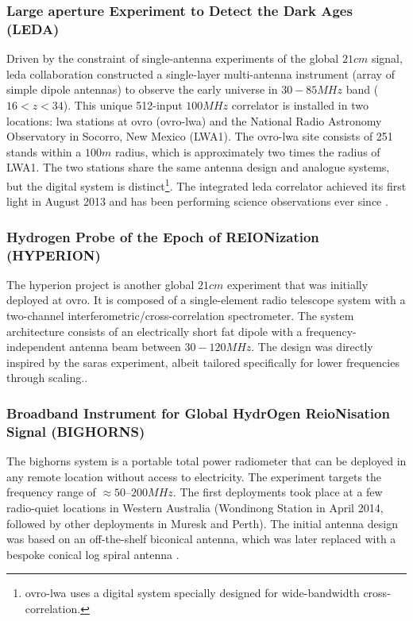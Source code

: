 \documentclass[12pt, TexShade, letterpaper]{report}
\begin{document}
\subsubsection{Large aperture Experiment to Detect the Dark Ages (LEDA)}
Driven by the constraint of single-antenna experiments of the global $21cm$ signal, \gls{leda} collaboration constructed a single-layer multi-antenna instrument (array of simple dipole antennas) to observe the early universe in $30-85MHz$ band ($16 < z < 34$).
This unique 512-input $100MHz$ correlator is installed in two locations: \gls{lwa} stations at \gls{ovro} (\gls{ovro}-\gls{lwa}) and the National Radio Astronomy Observatory in Socorro, New Mexico (LWA1). 
The \gls{ovro}-\gls{lwa} site consists of 251 stands within a $100m$ radius, which is approximately two times the radius of LWA1. The two stations share the same antenna design and analogue systems, but the digital system is distinct\footnote{\gls{ovro}-\gls{lwa} uses a digital system specially designed for wide-bandwidth cross-correlation.}. The integrated \gls{leda} correlator achieved its first light in August 2013 and has been performing science observations ever since \cite{leda_beam, leda_foreground, leda_1, leda_2, leda_design}.\par

\subsubsection{Hydrogen Probe of the Epoch of REIONization (HYPERION)}
The \gls{hyperion} project is another global $21cm$ experiment that was initially deployed at \gls{ovro}. It is composed of a single-element radio telescope system with a two-channel interferometric/cross-correlation spectrometer. The system architecture consists of an electrically short fat dipole with a frequency-independent antenna beam between $30-120 MHz$. The design was directly inspired by the \gls{saras} experiment, albeit tailored specifically for lower frequencies through scaling.\cite{hyperion_1, hyperion_2, hyperion_3}.\par

\subsubsection{Broadband Instrument for Global HydrOgen ReioNisation Signal (BIGHORNS)}
The \gls{bighorns} system is a portable total power radiometer that can be deployed in any remote location without access to electricity. The experiment targets the frequency range of $\approx 50–200 MHz$. The first deployments took place at a few radio-quiet locations in Western Australia (Wondinong Station in April 2014, followed by other deployments in  Muresk and Perth). The initial antenna design was based on an off-the-shelf biconical antenna, which was later replaced with a bespoke conical log spiral antenna \cite{bighorns_1}.
\end{document}
